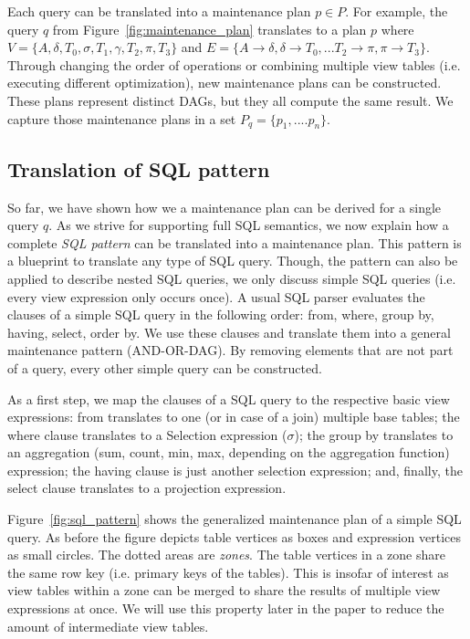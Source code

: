  Each query can be translated into a maintenance plan $p \in P$. 
 For example, the query $q$ from Figure~\ref{fig:maintenance_plan} 
 translates to a plan $p$ where $V=\{A, \delta, T_0, \sigma, 
T_1, \gamma, T_2, \pi, T_3\}$ and $E=\{A\rightarrow\delta, 
\delta\rightarrow T_0,...T_2\rightarrow\pi, \pi\rightarrow T_3\}$. 
Through changing the order of operations or combining multiple view 
tables (i.e. executing different optimization), new maintenance plans
can be constructed. These plans represent distinct DAGs, but they 
all compute the same result. We capture those maintenance plans in a set
 $P_q=\{p_1,....p_n\}$. 




\subsection{Translation of SQL pattern} 

So far, we have shown how we a maintenance plan can be derived for a 
single query $q$. As we strive for supporting full SQL semantics, we now 
explain how a complete \textit{SQL pattern} can be translated into a 
maintenance plan. This pattern is a blueprint to translate any type of 
SQL query. Though, the pattern can also be applied to describe nested 
SQL queries, we only discuss simple SQL queries (i.e. every view 
expression only occurs once). A usual SQL parser evaluates the clauses 
of a simple SQL query in the following order: from, where, group by, 
having, select, order by. We use these clauses and translate them into a 
general maintenance pattern (AND-OR-DAG). By removing elements that are 
not part of a query, every other simple query can be constructed. 

As a first step, we map the clauses of a SQL query to the respective 
basic view expressions: from translates to one (or in case of a join) 
multiple base tables; the where clause translates to a Selection 
expression ($\sigma$); the group by translates to an aggregation (sum, 
count, min, max, depending on the aggregation function) expression; the 
having clause is just another selection expression; and, finally, the 
select clause translates to a projection expression. 

Figure~\ref{fig:sql_pattern} shows the generalized maintenance plan of a 
simple SQL query. As before the figure depicts table vertices as boxes 
and expression vertices as small circles. The dotted areas are 
\textit{zones}. The table vertices in a zone share the same row key 
(i.e. primary keys of the tables). This is insofar of interest as view 
tables within a zone can be merged to share the results of multiple view 
expressions at once. We will use this property later in the paper to 
reduce the amount of intermediate view tables. 

